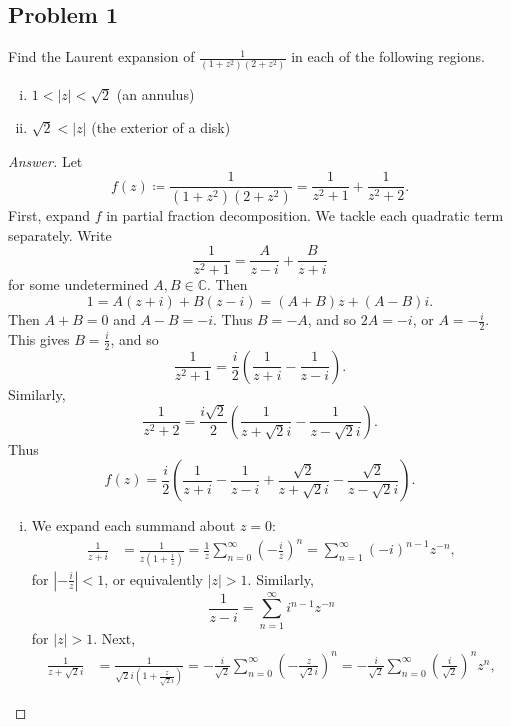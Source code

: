 \documentclass[12pt]{article}
\newcommand{\cx}{\mathbb{C}}
\newcommand\paren[1]{\left( #1 \right)}
\theoremstyle{definition}
\begin{document}
\subsection{Problem 1}
Find the Laurent expansion of $\displaystyle \frac{1}{\paren{1+z^2}\paren{2+z^2}}$ in each of the following regions.
\begin{enumerate}[(i)]
    \item $1 < |z| < \sqrt{2}$ (an annulus)
    \item $\sqrt{2} < |z|$ (the exterior of a disk)
\end{enumerate}
\begin{proof}[Answer]
    Let 
    \[
        f(z) \coloneqq \frac{1}{\paren{1+z^2}\paren{2+z^2}} = \frac{1}{z^2 + 1} + \frac{1}{z^2 + 2}.
    \]
    First, expand $f$ in partial fraction decomposition. We tackle each quadratic term separately. Write
    \[
        \frac{1}{z^2 + 1} = \frac{A}{z - i} + \frac{B}{z + i}
    \]
    for some undetermined $A , B \in \cx$. Then 
    \[
        1 = A(z + i) + B(z - i) = (A + B)z + (A - B)i.
    \]
    Then $A + B = 0$ and $A - B = -i$. Thus $B = -A$, and so $2A = -i$, or $A = -\frac{i}{2}$. This gives $B = \frac{i}{2}$, and so 
    \[
        \frac{1}{z^2 + 1} = \frac{i}{2} \paren{ \frac{1}{z + i} - \frac{1}{z - i} }.
    \]
    Similarly, 
    \[
        \frac{1}{z^2 + 2} = \frac{i\sqrt{2}}{2} \paren{ \frac{1}{z + \sqrt{2} i} - \frac{1}{z - \sqrt{2} i} }.
    \]
    Thus 
    \[
        f(z) = \frac{i}{2} \paren{ \frac{1}{z + i} - \frac{1}{z - i} + \frac{\sqrt{2}}{z + \sqrt{2} i} - \frac{\sqrt{2}}{z - \sqrt{2} i} }.
    \]
    \begin{enumerate}[(i)]
        \item We expand each summand about $z = 0$:
        \begin{align*}
            \frac{1}{z + i} & = \frac{1}{z \paren{ 1 + \frac{i}{z} } } = \frac{1}{z} \sum\limits_{n = 0}^{\infty} \paren{ -\frac{i}{z} }^n = \sum\limits_{n = 1}^{\infty} (-i)^{n-1} z^{-n},
        \end{align*}
        for $\left| -\frac{i}{z} \right| < 1$, or equivalently $|z| > 1$. Similarly,
        \[
            \frac{1}{z - i} = \sum\limits_{n = 1}^{\infty} i^{n-1} z^{-n}
        \]
        for $|z| > 1$. Next,
        \begin{align*}
            \frac{1}{z + \sqrt{2}i} & = \frac{1}{\sqrt{2}i \paren{ 1 + \frac{z}{\sqrt{2}i} } } = -\frac{i}{\sqrt{2}} \sum\limits_{n = 0}^{\infty} \paren{ - \frac{z}{\sqrt{2}i} }^n =  -\frac{i}{\sqrt{2}} \sum\limits_{n = 0}^{\infty} \paren{ \frac{i}{\sqrt{2}} }^n z^n,

\end{align*}
\end{enumerate}
\end{proof}
\end{document}

